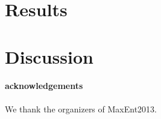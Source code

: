 \documentclass[12pt]{emulateapj}
\newcommand{\project}[1]{\textsl{#1}}
\begin{document}


\section{Results}

\section{Discussion}


\paragraph{acknowledgements}
We thank the organizers of MaxEnt2013.
\end{document}
